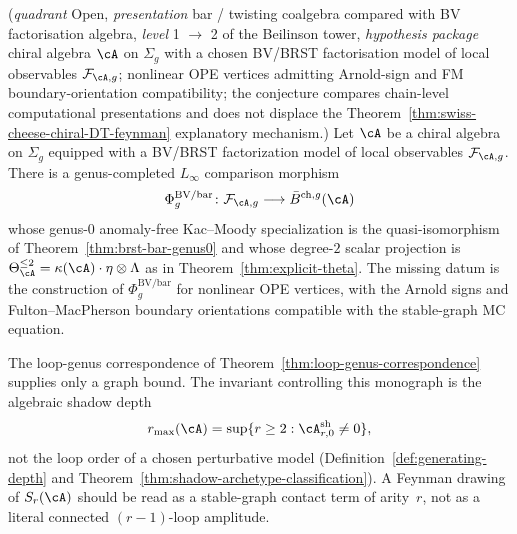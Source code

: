 \begin{conjecture}\label{conj:v1-bar-cobar-path-integral}
\textup{(}\emph{quadrant} Open, \emph{presentation} bar / twisting
coalgebra compared with BV factorisation algebra,
\emph{level} 1 $\to$ 2 of the Beilinson tower,
\emph{hypothesis package} chiral algebra $\cA$ on $\Sigma_g$ with a
chosen BV/BRST factorisation model of local observables
$\mathcal{F}_{\cA, g}$; nonlinear OPE vertices admitting Arnold-sign
and FM boundary-orientation compatibility; the conjecture compares
chain-level computational presentations and does not displace the
Theorem~\ref{thm:swiss-cheese-chiral-DT-feynman} explanatory
mechanism.\textup{)}
Let $\cA$ be a chiral algebra on $\Sigma_g$ equipped with a
BV/BRST factorization model of local observables
$\mathcal{F}_{\cA,g}$.  There is a genus-completed
$L_\infty$ comparison morphism
\[
\Phi_g^{\mathrm{BV/bar}}\colon
\mathcal{F}_{\cA,g}\longrightarrow \bar{B}^{\mathrm{ch},g}(\cA)
\]
whose genus-$0$ anomaly-free Kac--Moody specialization is the
quasi-isomorphism of Theorem~\ref{thm:brst-bar-genus0} and whose
degree-$2$ scalar projection is
$\Theta_\cA^{\leq 2}=\kappa(\cA)\cdot\eta\otimes\Lambda$
as in Theorem~\ref{thm:explicit-theta}.  The missing datum is the
construction of $\Phi_g^{\mathrm{BV/bar}}$ for nonlinear OPE vertices,
with the Arnold signs and Fulton--MacPherson boundary orientations
compatible with the stable-graph MC equation.
\end{conjecture}

\begin{remark}
\label{rem:feynman-depth-decomposition}
The loop-genus correspondence of
Theorem~\ref{thm:loop-genus-correspondence} supplies only a graph
bound.  The invariant controlling this monograph is the algebraic
shadow depth
\[
r_{\max}(\cA)=\sup\{r\geq 2:\cA^{\mathrm{sh}}_{r,0}\neq 0\},
\]
not the loop order of a chosen perturbative model
(Definition~\ref{def:generating-depth} and
Theorem~\ref{thm:shadow-archetype-classification}).  A Feynman drawing
of $S_r(\cA)$ should be read as a stable-graph contact term of
arity~$r$, not as a literal connected $(r-1)$-loop amplitude.
\end{remark}

